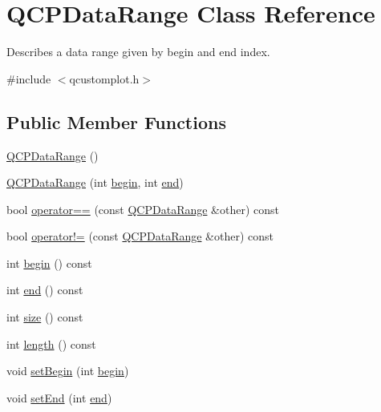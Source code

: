 \hypertarget{class_q_c_p_data_range}{}\section{Q\+C\+P\+Data\+Range Class Reference}
\label{class_q_c_p_data_range}


Describes a data range given by begin and end index.  




{\ttfamily \#include $<$qcustomplot.\+h$>$}

\subsection*{Public Member Functions}
\begin{DoxyCompactItemize}
\item 
\hyperlink{class_q_c_p_data_range_a49e72fd9bace1da9d875136dcc04c986}{Q\+C\+P\+Data\+Range} ()
\item 
\hyperlink{class_q_c_p_data_range_a6c7f4a3684210423270515403060e9cf}{Q\+C\+P\+Data\+Range} (int \hyperlink{class_q_c_p_data_range_ae76d7eba9defdfafcd0fc41096793129}{begin}, int \hyperlink{class_q_c_p_data_range_aee1b20fb045929c3753ee2ce14af7630}{end})
\item 
bool \hyperlink{class_q_c_p_data_range_a8bfd79a282f6ebd766d60caa683242d3}{operator==} (const \hyperlink{class_q_c_p_data_range}{Q\+C\+P\+Data\+Range} \&other) const
\item 
bool \hyperlink{class_q_c_p_data_range_a5bcc9597731a7455407853ed0585f6ab}{operator!=} (const \hyperlink{class_q_c_p_data_range}{Q\+C\+P\+Data\+Range} \&other) const
\item 
int \hyperlink{class_q_c_p_data_range_ae76d7eba9defdfafcd0fc41096793129}{begin} () const
\item 
int \hyperlink{class_q_c_p_data_range_aee1b20fb045929c3753ee2ce14af7630}{end} () const
\item 
int \hyperlink{class_q_c_p_data_range_ac6af055e509d1b691c244954ff1c5887}{size} () const
\item 
int \hyperlink{class_q_c_p_data_range_a1e7836058f755c6ab9f11996477b7150}{length} () const
\item 
void \hyperlink{class_q_c_p_data_range_a54ff59048e01e46ac4aefafc844626c6}{set\+Begin} (int \hyperlink{class_q_c_p_data_range_ae76d7eba9defdfafcd0fc41096793129}{begin})
\item 
void \hyperlink{class_q_c_p_data_range_a277f1a9eafe70b9184d9c00b641ae5de}{set\+End} (int \hyperlink{class_q_c_p_data_range_aee1b20fb045929c3753ee2ce14af7630}{end})

\end{DoxyCompactItemize}
